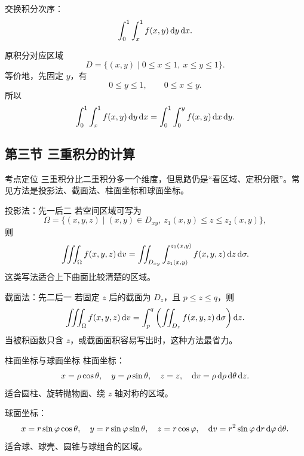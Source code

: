 \begin{problem}
交换积分次序：
\[
  \int_0^1\int_x^1 f(x,y)\mathop{}\!\mathrm{d} y\mathop{}\!\mathrm{d} x.
\]
\end{problem}
\begin{solution}
原积分对应区域
\[
  D=\{(x,y)\mid 0\le x\le1,\ x\le y\le1\}.
\]
等价地，先固定 $y$，有
\[
  0\le y\le1,\qquad 0\le x\le y.
\]
所以
\[
  \int_0^1\int_x^1 f(x,y)\mathop{}\!\mathrm{d} y\mathop{}\!\mathrm{d} x
  =\int_0^1\int_0^y f(x,y)\mathop{}\!\mathrm{d} x\mathop{}\!\mathrm{d} y.
\]
\end{solution}

\subsection{第三节 三重积分的计算}

\begin{summarybox}{考点定位}
三重积分比二重积分多一个维度，但思路仍是“看区域、定积分限”。常见方法是投影法、截面法、柱面坐标和球面坐标。
\end{summarybox}

\begin{methodbox}{投影法：先一后二}
若空间区域可写为
\[
  \Omega=\{(x,y,z)\mid (x,y)\in D_{xy},\ z_1(x,y)\le z\le z_2(x,y)\},
\]
则
\[
  \iiint_\Omega f(x,y,z)\mathop{}\!\mathrm{d} v
  =\iint_{D_{xy}}\int_{z_1(x,y)}^{z_2(x,y)}
  f(x,y,z)\mathop{}\!\mathrm{d} z\mathop{}\!\mathrm{d}\sigma.
\]
这类写法适合上下曲面比较清楚的区域。
\end{methodbox}

\begin{methodbox}{截面法：先二后一}
若固定 $z$ 后的截面为 $D_z$，且 $p\le z\le q$，则
\[
  \iiint_\Omega f(x,y,z)\mathop{}\!\mathrm{d} v
  =\int_p^q\left(\iint_{D_z} f(x,y,z)\mathop{}\!\mathrm{d}\sigma\right)\mathop{}\!\mathrm{d} z.
\]
当被积函数只含 $z$，或截面面积容易写出时，这种方法最省力。
\end{methodbox}

\begin{methodbox}{柱面坐标与球面坐标}
柱面坐标：
\[
  x=\rho\cos\theta,\quad y=\rho\sin\theta,\quad z=z,\quad
  \mathop{}\!\mathrm{d} v=\rho\mathop{}\!\mathrm{d}\rho\mathop{}\!\mathrm{d}\theta\mathop{}\!\mathrm{d} z.
\]
适合圆柱、旋转抛物面、绕 $z$ 轴对称的区域。

球面坐标：
\[
  x=r\sin\varphi\cos\theta,\quad
  y=r\sin\varphi\sin\theta,\quad
  z=r\cos\varphi,\quad
  \mathop{}\!\mathrm{d} v=r^2\sin\varphi\mathop{}\!\mathrm{d} r\mathop{}\!\mathrm{d}\varphi\mathop{}\!\mathrm{d}\theta.
\]
适合球、球壳、圆锥与球组合的区域。
\end{methodbox}

